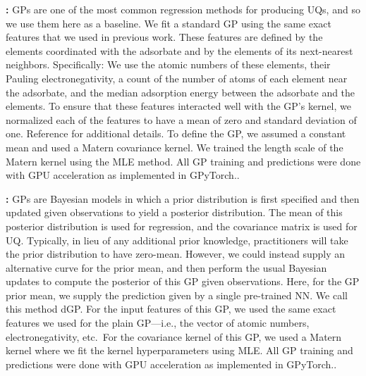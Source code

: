 \documentclass[]{achemso}
\begin{document}
\textbf{:}
\gls{GP}s are one of the most common regression methods for producing \gls{UQ}s, and so we use them here as a baseline.
We fit a standard \gls{GP} using the same exact features that we used in previous work.\cite{Tran2018}
These features are defined by the elements coordinated with the adsorbate and by the elements of its next-nearest neighbors.
Specifically:  We use the atomic numbers of these elements, their Pauling electronegativity, a count of the number of atoms of each element near the adsorbate, and the median adsorption energy between the adsorbate and the elements.
To ensure that these features interacted well with the \gls{GP}'s kernel, we normalized each of the features to have a mean of zero and standard deviation of one.
Reference \citet{Tran2018} for additional details.
To define the \gls{GP}, we assumed a constant mean and used a Matern covariance kernel.
We trained the length scale of the Matern kernel using the \gls{MLE} method.
All \gls{GP} training and predictions were done with GPU acceleration as implemented in GPyTorch.\cite{Gardner2018}.

\textbf{:}
\gls{GP}s are Bayesian models in which a prior distribution is first specified and then updated given observations to yield a posterior distribution. 
The mean of this posterior distribution is used for regression, and the covariance matrix is used for \gls{UQ}. 
Typically, in lieu of any additional prior knowledge, practitioners will take the prior distribution to have zero-mean. 
However, we could instead supply an alternative curve for the prior mean, and then perform the usual Bayesian updates to compute the posterior of this \gls{GP} given observations. 
Here, for the \gls{GP} prior mean, we supply the prediction given by a single pre-trained \gls{NN}. 
We call this method \gls{dGP}.
For the input features of this \gls{GP}, we used the same exact features we used for the plain \gls{GP}---i.e., the vector of atomic numbers, electronegativity, etc.\
For the covariance kernel of this \gls{GP}, we used a Matern kernel where we fit the kernel hyperparameters using \gls{MLE}. 
All \gls{GP} training and predictions were done with GPU acceleration as implemented in GPyTorch.\cite{Gardner2018}.
\end{document}
